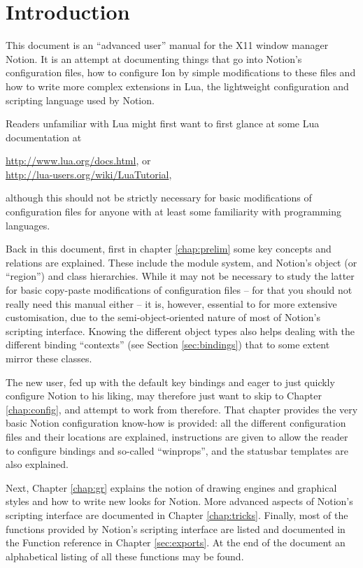 
\chapter{Introduction}

This document is an ``advanced user'' manual for the X11 window manager
Notion. It is an attempt at documenting things that go into Notion's
configuration files, how to configure Ion by simple modifications 
to these files and how to write more complex extensions in Lua, the 
lightweight configuration and scripting language used by Notion. 

Readers unfamiliar with Lua might first want to first glance at some 
Lua documentation at

\begin{center}
    \url{http://www.lua.org/docs.html}, or \\
    \url{http://lua-users.org/wiki/LuaTutorial},
\end{center}

although this should not be strictly necessary for basic modifications
of configuration files for anyone with at least some familiarity with
programming languages.

Back in this document, first in chapter \ref{chap:prelim} some key
concepts and relations are explained. These include the module system,
and Notion's object (or ``region'') and class hierarchies. While it may
not be necessary to study the latter for basic copy-paste modifications
of configuration files -- for that you should not really need this
manual either -- it is, however, essential to for more extensive
customisation, due to the semi-object-oriented nature of most of
Notion's scripting interface. Knowing the different object types also
helps dealing with the different binding ``contexts'' (see
Section \ref{sec:bindings}) that to some extent mirror these classes.

The new user, fed up with the default key bindings and eager to 
just quickly configure Notion to his liking, may therefore just want
to skip to Chapter \ref{chap:config}, and attempt to work from therefore.
That chapter provides the very basic Notion configuration know-how
is provided: all the different configuration files and their locations
are explained, instructions are given to allow the reader to
configure bindings and so-called ``winprops'', and the statusbar
templates are also explained. 

Next, Chapter \ref{chap:gr} explains the notion of drawing engines
and graphical styles and how to write new looks for Notion. More advanced
aspects of Notion's scripting interface are documented in Chapter 
\ref{chap:tricks}. 
Finally, most of the functions provided by Notion's scripting interface
are listed and documented in the Function reference in Chapter
\ref{sec:exports}. At the end of the document an alphabetical
listing of all these functions may be found.

